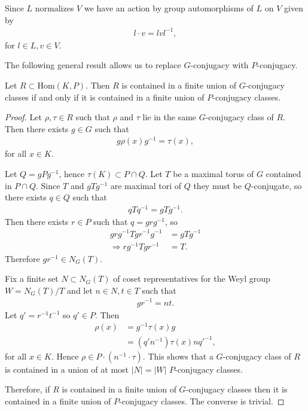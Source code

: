 Since $L$ normalizes $V$ we have an action by group automorphisms of $L$ on $V$ given by
\begin{align} \label{laction} l \cdot v = lvl^{-1}, \end{align}
for $l \in L, v \in V$.


The following general result allows us to replace $G$-conjugacy with $P$-conjugacy.
\begin{lemma} Let $R \subset \mathrm{Hom}(K, P)$. Then $R$ is contained in a finite union of $G$-conjugacy classes if and only if it is contained in a finite union of $P$-conjugacy classes.
  \label{lem:GPconj}
\end{lemma}
\begin{proof}
	Let $\rho, \tau \in R$ such that $\rho$ and $\tau$ lie in the same $G$-conjugacy class of $R$. Then there exists $g\in G$ such that
	\begin{align*}
		g \rho(x) g^{-1} = \tau(x),
	\end{align*}
for all $x \in K$.
	
	Let $Q = gPg^{-1}$, hence $\tau(K) \subset P \cap Q$.
	Let $T$ be a maximal torus of $G$ contained in $P\cap Q$. Since $T$ and $gTg^{-1}$ are maximal tori of $Q$ they must be $Q$-conjugate, so there exists $q\in Q$ such that
	\begin{align*}
		qTq^{-1} = gTg^{-1}.
	\end{align*}
	Then there exists $r\in P$ such that $q = grg^{-1}$, so
	\begin{align*}
		grg^{-1}Tgr^{-1}g^{-1} &= gTg^{-1} \\
		\Rightarrow rg^{-1}Tgr^{-1} &= T.
	\end{align*}
	Therefore $gr^{-1} \in N_G(T)$. 

	Fix a finite set $N \subset N_G(T)$ of coset representatives for the Weyl group $W = N_G(T)/T$ and let $n \in N, t \in T$ such that
	\begin{align*}
		gr^{-1} = nt.
	\end{align*}
	Let $q' = r^{-1}t^{-1}$ so $q' \in P$. Then
	\begin{align*}
		\rho(x) &= g^{-1} \tau(x) g\\
		&= (q'n^{-1}) \tau(x) nq'^{-1},
	\end{align*}
	for all $x \in K$. Hence $\rho\in P\cdot(n^{-1}\cdot \tau)$.
	This shows 
	that a $G$-conjugacy class of $R$ is contained in a union of at most $|N| = |W|$ $P$-conjugacy classes.

	Therefore, if $R$ is contained in a finite union of $G$-conjugacy classes then it is contained in a finite union of $P$-conjugacy classes. The converse is trivial.
\end{proof}


